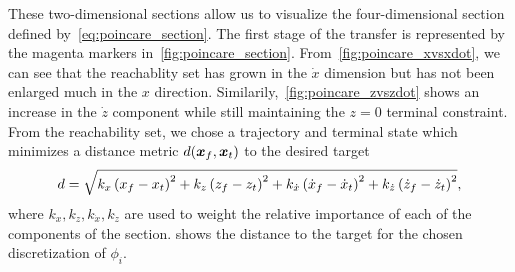 \documentclass[]{aiaa-tc}%
\begin{document}
These two-dimensional sections allow us to visualize the four-dimensional \Poincare section defined by~\cref{eq:poincare_section}.
The first stage of the transfer is represented by the magenta markers in~\cref{fig:poincare_section}.
From~\cref{fig:poincare_xvsxdot}, we can see that the reachablity set has grown in the \( \dot{x} \) dimension but has not been enlarged much in the \( x \) direction.
Similarily,~\cref{fig:poincare_zvszdot} shows an increase in the \( \dot{z} \) component while still maintaining the \( z = 0 \) terminal constraint.
From the reachability set, we chose a trajectory and terminal state which minimizes a distance metric \( d(\bm{x}_f,\bm{x}_t) \) to the desired target
\begin{align}\label{eq:reach_dist}
    d = \sqrt{k_x \left( x_f - x_t  \right)^2 + k_z \left( z_f - z_t  \right)^2 + k_{\dot{x}}\left( \dot{x}_f - \dot{x}_t  \right)^2 + k_{\dot{z}}\left( \dot{z}_f - \dot{z}_t  \right)^2} ,
\end{align}
where \( k_x, k_z, k_{\dot{x}}, k_{\dot{z}} \) are used to weight the relative importance of each of the components of the \Poincare section.
 shows the distance to the target for the chosen discretization of \( \phi_i \).
\end{document}
